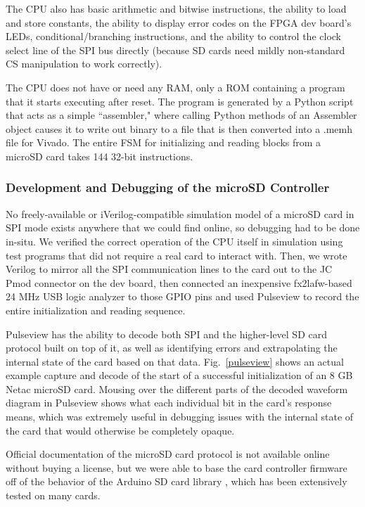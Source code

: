 \documentclass[conference]{IEEEtran}
\begin{document}
The CPU also has basic arithmetic and bitwise instructions, the ability to load and store constants, the ability to display error codes on the FPGA dev board's LEDs, conditional/branching instructions, and the ability to control the clock select line of the SPI bus directly (because SD cards need mildly non-standard CS manipulation to work correctly).

The CPU does not have or need any RAM, only a ROM containing a program that it starts executing after reset. The program is generated by a Python script that acts as a simple ``assembler," where calling Python methods of an Assembler object causes it to write out binary to a file that is then converted into a .memh file for Vivado. The entire FSM for initializing and reading blocks from a microSD card takes 144 32-bit instructions.

\subsubsection{Development and Debugging of the microSD Controller}

No freely-available or iVerilog-compatible simulation model of a microSD card in SPI mode exists anywhere that we could find online, so debugging had to be done in-situ. We verified the correct operation of the CPU itself in simulation using test programs that did not require a real card to interact with. Then, we wrote Verilog to mirror all the SPI communication lines to the card out to the JC Pmod connector on the dev board, then connected an inexpensive fx2lafw-based 24 MHz USB logic analyzer to those GPIO pins and used Pulseview to record the entire initialization and reading sequence.

Pulseview has the ability to decode both SPI and the higher-level SD card protocol built on top of it, as well as identifying errors and extrapolating the internal state of the card based on that data. Fig.~\ref{pulseview} shows an actual example capture and decode of the start of a successful initialization of an 8 GB Netac microSD card. Mousing over the different parts of the decoded waveform diagram in Pulseview shows what each individual bit in the card's response means, which was extremely useful in debugging issues with the internal state of the card that would otherwise be completely opaque.

Official documentation of the microSD card protocol is not available online without buying a license, but we were able to base the card controller firmware off of the behavior of the Arduino SD card library \cite{b4}, which has been extensively tested on many cards.
\end{document}
